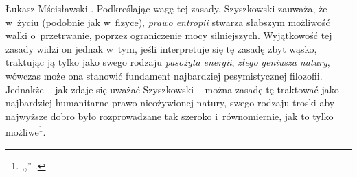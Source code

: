 \begin{artplenv}{Łukasz Mścisławski}
\parencite[por.][s.~32–33]{szyszkowski_1909}. %
 Podkreślając wagę tej zasady, Szyszkowski zauważa, że w~życiu (podobnie jak w~fizyce), \textit{prawo entropii} stwarza słabszym możliwość walki o~przetrwanie, poprzez ograniczenie mocy silniejszych. Wyjątkowość tej zasady widzi on jednak w~tym, jeśli interpretuje się tę zasadę zbyt wąsko, traktując ją tylko jako swego rodzaju \textit{pasożyta energii}, \textit{złego geniusza natury}, wówczas może ona stanowić fundament najbardziej pesymistycznej filozofii. Jednakże -- jak zdaje się uważać Szyszkowski -- można zasadę tę traktować jako najbardziej humanitarne prawo nieożywionej natury, swego rodzaju troski aby najwyższe dobro było rozprowadzane tak szeroko i~równomiernie, jak to tylko możliwe\footnote{,,'' 
\parencite[][s.~33]{szyszkowski_1909}.}.


\end{artplenv}
